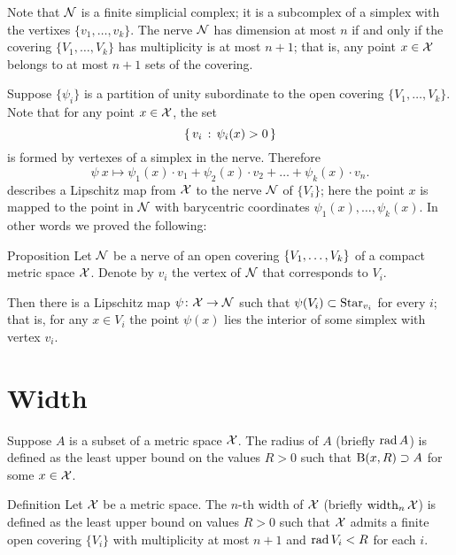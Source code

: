 Note that $\mathcal{N}$ is a finite simplicial complex;
it is a subcomplex of a simplex with the vertixes $\{v_1,\dots,v_k\}$.
The nerve $\mathcal{N}$ has dimension at most $n$ if and only if the covering $\{V_1,\dots,V_k\}$ has multiplicity is at most $n+1$;
that is, any point $x\in\mathcal{X}$ belongs to
at most $n+1$ sets of the covering.

Suppose $\{\psi_i\}$ is  
a partition of unity subordinate to the open covering $\{V_1,\dots,V_k\}$.
Note that for any point $x\in {\mathcal{X}}$, the set
$$\left\{\,{v_i}\,:\,{\psi_i(x)>0}\,\right\}$$
is formed by vertexes of a simplex in the nerve.
Therefore 
$$\psi\:x\mapsto \psi_1(x)\cdot v_1+\psi_2(x)\cdot v_2+\dots+\psi_k(x)\cdot v_n.$$
describes a Lipschitz map from ${\mathcal{X}}$ to the nerve $\mathcal{N}$ of $\{V_i\}$;
here the point $x$ is mapped to the point in $\mathcal{N}$ with barycentric coordinates $\psi_1(x),\dots,\psi_k(x)$.
In other words we proved the following:

\begin{thm}{Proposition}\label{prop:space->nerve}
Let $\mathcal{N}$ be a nerve of an open covering $\{V_1,\z\dots,V_k\}$ of a compact metric space $\mathcal{X}$.
Denote by $v_i$ the vertex of $\mathcal{N}$ that corresponds to $V_i$.

Then there is a Lipschitz map $\psi\colon\mathcal{X}\to\mathcal{N}$ such that $\psi(V_i)\z\subset\Star_{v_i}$ for every $i$;
that is, for any $x\in V_i$ the point $\psi(x)$ lies the interior of some simplex with vertex $v_i$.\index{$\Star$}
\end{thm}


\section{Width}

Suppose $A$ is a subset of a metric space $\mathcal{X}$.
The radius of $A$ (briefly $\mathop{\rm rad}\nolimits A$) is defined as the least upper bound on the values $R>0$ such that $\mathrm{B}{}(x,R)\supset A$ for some $x\in \mathcal{X}$.

\begin{thm}{Definition}\label{def:width}
Let $\mathcal{X}$ be a metric space.
The $n$-th width of $\mathcal{X}$ (briefly $\operatorname{\rm width}\nolimits_n\mathcal{X}$) is defined as the least upper bound on values $R>0$ such that $\mathcal{X}$ admits a finite open covering $\{V_i\}$ with multiplicity at most $n+1$ and $\mathop{\rm rad}\nolimits V_i< R$ for each $i$.
\end{thm}

